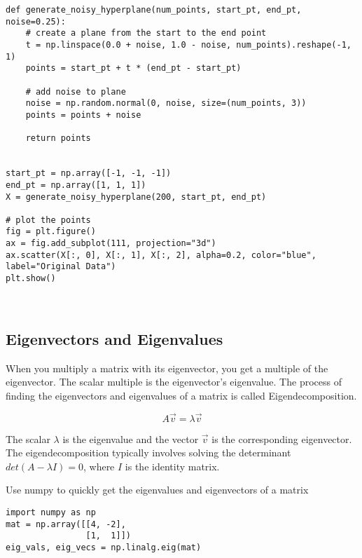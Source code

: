 \documentclass[openany]{book}
\begin{document}
\begin{tcolorbox}
\tiny
\begin{verbatim}
def generate_noisy_hyperplane(num_points, start_pt, end_pt, noise=0.25):
    # create a plane from the start to the end point
    t = np.linspace(0.0 + noise, 1.0 - noise, num_points).reshape(-1, 1)
    points = start_pt + t * (end_pt - start_pt)

    # add noise to plane
    noise = np.random.normal(0, noise, size=(num_points, 3))
    points = points + noise

    return points


start_pt = np.array([-1, -1, -1])
end_pt = np.array([1, 1, 1])
X = generate_noisy_hyperplane(200, start_pt, end_pt)

# plot the points
fig = plt.figure()
ax = fig.add_subplot(111, projection="3d")
ax.scatter(X[:, 0], X[:, 1], X[:, 2], alpha=0.2, color="blue", label="Original Data")
plt.show()
\end{verbatim}
\end{tcolorbox}

    \begin{center}
    \end{center}
    { \hspace*{\fill} \\}
    
    \subsection{Eigenvectors and
Eigenvalues}\label{eigenvectors-and-eigenvalues}

When you multiply a matrix with its eigenvector, you get a multiple of
the eigenvector. The scalar multiple is the eigenvector's eigenvalue.
The process of finding the eigenvectors and eigenvalues of a matrix is
called Eigendecomposition.

\[A \vec{v} = \lambda \vec{v}\]

The scalar \(\lambda\) is the eigenvalue and the vector \(\vec{v}\) is
the corresponding eigenvector. The eigendecomposition typically involves
solving the determinant \(det(A - \lambda I) = 0\), where \(I\) is the
identity matrix.

Use numpy to quickly get the eigenvalues and eigenvectors of a matrix

\begin{tcolorbox}
\tiny
\begin{verbatim}
import numpy as np
mat = np.array([[4, -2],
                [1,  1]])
eig_vals, eig_vecs = np.linalg.eig(mat)
\end{verbatim}
\end{tcolorbox}
\end{document}
